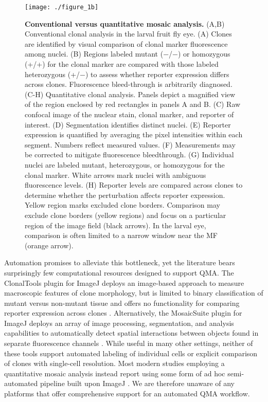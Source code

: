 \documentclass[10pt,letterpaper]{article}
\begin{document}
\begin{figure}[!h]
\centering
\texttt{[image: ./figure\_1b]}
\caption[Conventional versus quantitative mosaic analysis.]{\textbf{Conventional versus quantitative mosaic analysis.} (A,B) Conventional clonal analysis in the larval fruit fly eye. (A) Clones are identified by visual comparison of clonal marker fluorescence among nuclei. (B) Regions labeled mutant ($-$/$-$) or homozygous (+/+) for the clonal marker are compared with those labeled heterozygous (+/$-$) to assess whether reporter expression differs across clones. Fluorescence bleed-through is arbitrarily diagnosed. (C-H) Quantitative clonal analysis. Panels depict a magnified view of the region enclosed by red rectangles in panels A and B. (C) Raw confocal image of the nuclear stain, clonal marker, and reporter of interest. (D) Segmentation identifies distinct nuclei. (E) Reporter expression is quantified by averaging the pixel intensities within each segment. Numbers reflect measured values. (F) Measurements may be corrected to mitigate fluorescence bleedthrough. (G) Individual nuclei are labeled mutant, heterozygous, or homozygous for the clonal marker. White arrows mark nuclei with ambiguous fluorescence levels. (H) Reporter levels are compared across clones to determine whether the perturbation affects reporter expression. Yellow region marks excluded clone borders. Comparison may exclude clone borders (yellow regions) and focus on a particular region of the image field (black arrows). In the larval eye, comparison is often limited to a narrow window near the MF (orange arrow).}
\label{fig1b}
\end{figure}

Automation promises to alleviate this bottleneck, yet the literature bears surprisingly few computational resources designed to support QMA. The ClonalTools plugin for ImageJ deploys an image-based approach to measure macroscopic features of clone morphology, but is limited to binary classification of mutant versus non-mutant tissue and offers no functionality for comparing reporter expression across clones \cite{Mort2009}. Alternatively, the MosaicSuite plugin for ImageJ deploys an array of image processing, segmentation, and analysis capabilities to automatically detect spatial interactions between objects found in separate fluorescence channels \cite{Helmuth2010,Shivanandan2013}. While useful in many other settings, neither of these tools support automated labeling of individual cells or explicit comparison of clones with single-cell resolution. Most modern studies employing a quantitative mosaic analysis instead report using some form of ad hoc semi-automated pipeline built upon ImageJ \cite{Dai2017,Ghiglione2018,Li2018}. We are therefore unaware of any platforms that offer comprehensive support for an automated QMA workflow.
\end{document}
